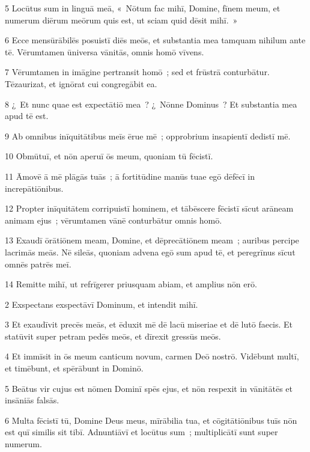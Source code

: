 \psalmVerse
  {\phantom{00}5}
  {Locūtus sum in linguā meā, «~Nōtum fac mihī, Domine, fīnem meum, et numerum diērum meōrum quis est, ut sciam quid dēsit mihī.~»}


\psalmVerse
  {\phantom{00}6}
  {Ecce mensūrābilēs posuistī diēs meōs, et substantia mea tamquam nihilum ante tē. Vērumtamen ūniversa vānitās, omnis homō vīvens.}


\psalmVerse
  {\phantom{00}7}
  {Vērumtamen in imāgine pertransit homō~; sed et frūstrā conturbātur. Tēzaurizat, et ignōrat cui congregābit ea.}


\psalmVerse
  {\phantom{00}8}
  {¿~Et nunc quae est expectātiō mea~? ¿~Nōnne Dominus~? Et substantia mea apud tē est.}


\psalmVerse
  {\phantom{00}9}
  {Ab omnibus inīquitātibus meīs ērue mē~; opprobrium insapientī dedistī mē.}


\psalmVerse
  {\phantom{0}10}
  {Obmūtuī, et nōn aperuī ōs meum, quoniam tū fēcistī.}


\psalmVerse
  {\phantom{0}11}
  {Āmovē ā mē plāgās tuās~; ā fortitūdine manūs tuae egō dēfēcī in increpātiōnibus.}


\psalmVerse
  {\phantom{0}12}
  {Propter inīquitātem corripuistī hominem, et tābēscere fēcistī sīcut arāneam animam ejus~; vērumtamen vānē conturbātur omnis homō.}


\psalmVerse
  {\phantom{0}13}
  {Exaudī ōrātiōnem meam, Domine, et dēprecātiōnem meam~; auribus percipe lacrimās meās. Nē sileās, quoniam advena egō sum apud tē, et peregrīnus sīcut omnēs patrēs meī.}


\psalmVerse
  {\phantom{0}14}
  {Remitte mihī, ut refrīgerer priusquam abiam, et amplius nōn erō.}



\psalmVerse
  {\phantom{00}2}
  {Exspectans exspectāvī Dominum, et intendit mihī.}


\psalmVerse
  {\phantom{00}3}
  {Et exaudīvit precēs meās, et ēduxit mē dē lacū miseriae et dē lutō faecis. Et statūvit super petram pedēs meōs, et dīrexit gressūs meōs.}


\psalmVerse
  {\phantom{00}4}
  {Et immīsit in ōs meum canticum novum, carmen Deō nostrō. Vidēbunt multī, et timēbunt, et spērābunt in Dominō.}


\psalmVerse
  {\phantom{00}5}
  {Beātus vir cujus est nōmen Dominī spēs ejus, et nōn respexit in vānitātēs et insāniās falsās.}


\psalmVerse
  {\phantom{00}6}
  {Multa fēcistī tū, Domine Deus meus, mīrābilia tua, et cōgitātiōnibus tuīs nōn est quī similis sit tibī. Adnuntiāvī et locūtus sum~; multiplicātī sunt super numerum.}


